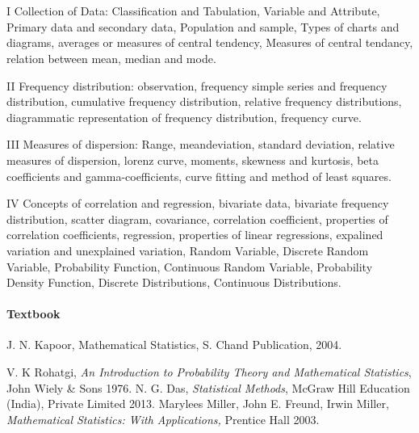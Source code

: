 \section{\courseinfo}

\unit{I}
Collection of Data: Classification and Tabulation, Variable and Attribute, Primary data and secondary data, Population and sample, Types of charts and diagrams, averages or measures of central tendency, Measures of central tendancy, relation between mean, median and mode.

\unit{II}
Frequency distribution: observation, frequency simple series and frequency distribution, cumulative frequency distribution, relative frequency distributions, diagrammatic representation of frequency distribution, frequency curve.

\unit{III}
Measures of dispersion: Range, meandeviation, standard deviation, relative measures of dispersion, lorenz curve, moments, skewness and kurtosis, beta coefficients and gamma-coefficients, curve fitting and method of least squares.

\unit{IV}
Concepts of correlation and regression, bivariate data, bivariate frequency distribution, scatter diagram, covariance, correlation coefficient, properties of correlation coefficients, regression, properties of linear regressions, expalined variation and unexplained variation, Random Variable, Discrete Random Variable, Probability Function, Continuous Random Variable, Probability Density Function, Discrete Distributions, Continuous Distributions.



\paragraph{Textbook}
J. N. Kapoor, Mathematical Statistics, S. Chand Publication, 2004.
\begin{thebibliography}{}
\let\clearpage\relax
{}     V. K Rohatgi, \emph{An Introduction to Probability Theory and Mathematical Statistics}, John Wiely \& Sons 1976.
     N. G. Das, \emph{Statistical Methods}, McGraw Hill Education (India), Private Limited 2013.
     Marylees Miller, John E. Freund, Irwin Miller, \emph{Mathematical Statistics: With Applications,} Prentice Hall 2003.
\end{thebibliography}













